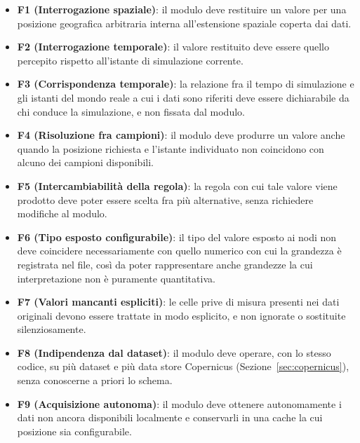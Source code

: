\begin{itemize}
    \item \textbf{F1 (Interrogazione spaziale)}: \label{req:F1} il modulo deve restituire
    un valore per una posizione geografica arbitraria interna all'estensione spaziale
    coperta dai dati.

    \item \textbf{F2 (Interrogazione temporale)}: \label{req:F2} il valore restituito deve
    essere quello percepito rispetto all'istante di simulazione corrente.

    \item \textbf{F3 (Corrispondenza temporale)}: \label{req:F3} la relazione fra il tempo
    di simulazione e gli istanti del mondo reale a cui i dati sono riferiti deve essere
    dichiarabile da chi conduce la simulazione, e non fissata dal modulo.

    \item \textbf{F4 (Risoluzione fra campioni)}: \label{req:F4} il modulo deve produrre un
    valore anche quando la posizione richiesta e l'istante individuato non coincidono con
    alcuno dei campioni disponibili.

    \item \textbf{F5 (Intercambiabilità della regola)}: \label{req:F5} la regola con cui
    tale valore viene prodotto deve poter essere scelta fra più alternative, senza
    richiedere modifiche al modulo.

    \item \textbf{F6 (Tipo esposto configurabile)}: \label{req:F6} il tipo del valore
    esposto ai nodi non deve coincidere necessariamente con quello numerico con cui la
    grandezza è registrata nel file, così da poter rappresentare anche grandezze la cui
    interpretazione non è puramente quantitativa.

    \item \textbf{F7 (Valori mancanti espliciti)}: \label{req:F7} le celle prive di misura
    presenti nei dati originali devono essere trattate in modo esplicito, e non ignorate o
    sostituite silenziosamente.

    \item \textbf{F8 (Indipendenza dal dataset)}: \label{req:F8} il modulo deve operare, con
    lo stesso codice, su più dataset e più data store Copernicus
    (Sezione~\ref{sec:copernicus}), senza conoscerne a priori lo schema.

    \item \textbf{F9 (Acquisizione autonoma)}: \label{req:F9} il modulo deve ottenere
    autonomamente i dati non ancora disponibili localmente e conservarli in una cache la
    cui posizione sia configurabile.


\end{itemize}
